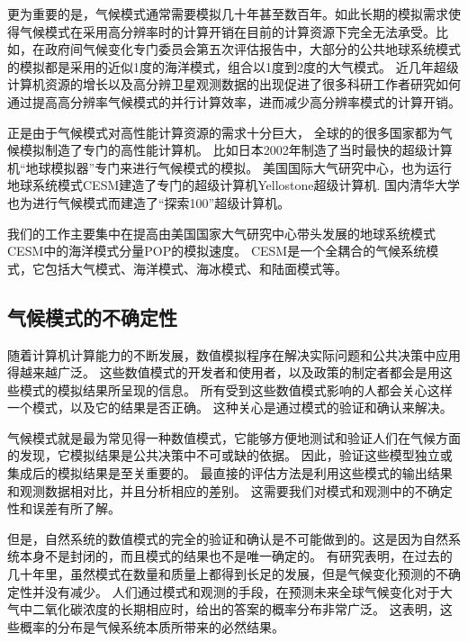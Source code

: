 更为重要的是，气候模式通常需要模拟几十年甚至数百年。如此长期的模拟需求使得气候模式在采用高分辨率时的计算开销在目前的计算资源下完全无法承受。比如，在政府间气候变化专门委员会第五次评估报告中，大部分的公共地球系统模式的模拟都是采用的近似1度的海洋模式，组合以1度到2度的大气模式。
近几年超级计算机资源的增长以及高分辨卫星观测数据的出现促进了很多科研工作者研究如何通过提高高分辨率气候模式的并行计算效率，进而减少高分辨率模式的计算开销。

正是由于气候模式对高性能计算资源的需求十分巨大， 全球的的很多国家都为气候模拟制造了专门的高性能计算机。 比如日本2002年制造了当时最快的超级计算机“地球模拟器”专门来进行气候模式的模拟\cite{habata2003earth}。
美国国际大气研究中心，也为运行地球系统模式CESM建造了专门的超级计算机Yellostone超级计算机\cite{loft:2015}. 
国内清华大学也为进行气候模式而建造了“探索100”超级计算机。

我们的工作主要集中在提高由美国国家大气研究中心带头发展的地球系统模式CESM中的海洋模式分量POP的模拟速度。 CESM是一个全耦合的气候系统模式，它包括大气模式、海洋模式、海冰模式、和陆面模式等。


 

\subsection{气候模式的不确定性}
随着计算机计算能力的不断发展，数值模拟程序在解决实际问题和公共决策中应用得越来越广泛。 
这些数值模式的开发者和使用者，以及政策的制定者都会是用这些模式的模拟结果所呈现的信息。
所有受到这些数值模式影响的人都会关心这样一个模式，以及它的结果是否正确。
这种关心是通过模式的验证和确认来解决\cite{whitner1989guidelines,stainforth2005uncertainty}。

气候模式就是最为常见得一种数值模式，它能够方便地测试和验证人们在气候方面的发现，它模拟结果是公共决策中不可或缺的依据\cite{allen2002towards,reynolds1994random}。
因此，验证这些模型独立或集成后的模拟结果是至关重要的。
最直接的评估方法是利用这些模式的输出结果和观测数据相对比，并且分析相应的差别。 
这需要我们对模式和观测中的不确定性和误差有所了解。 

但是，自然系统的数值模式的完全的验证和确认是不可能做到的。这是因为自然系统本身不是封闭的，而且模式的结果也不是唯一确定的\cite{oreskes1994verification}。
有研究表明，在过去的几十年里，虽然模式在数量和质量上都得到长足的发展，但是气候变化预测的不确定性并没有减少\cite{roe2007climate}。 
人们通过模式和观测的手段，在预测未来全球气候变化对于大气中二氧化碳浓度的长期相应时，给出的答案的概率分布非常广泛。
这表明，这些概率的分布是气候系统本质所带来的必然结果。 

